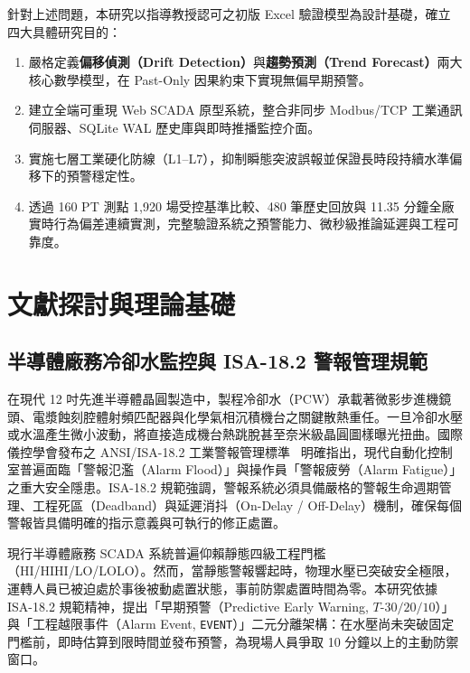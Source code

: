 \documentclass[fontset=none, a4paper, 12pt]{ctexart}
\begin{document}
\begin{doublespace}
針對上述問題，本研究以指導教授認可之初版 Excel 驗證模型為設計基礎，確立四大具體研究目的：
\begin{enumerate}
    \item 嚴格定義\textbf{偏移偵測（Drift Detection）}與\textbf{趨勢預測（Trend Forecast）}兩大核心數學模型，在 Past-Only 因果約束下實現無偏早期預警。
    \item 建立全端可重現 Web SCADA 原型系統，整合非同步 Modbus/TCP 工業通訊伺服器、SQLite WAL 歷史庫與即時推播監控介面。
    \item 實施七層工業硬化防線（L1–L7），抑制瞬態突波誤報並保證長時段持續水準偏移下的預警穩定性。
    \item 透過 160 PT 測點 1,920 場受控基準比較、480 筆歷史回放與 11.35 分鐘全廠實時行為偏差連續實測，完整驗證系統之預警能力、微秒級推論延遲與工程可靠度。
\end{enumerate}

\clearpage
\section{文獻探討與理論基礎}

\subsection{半導體廠務冷卻水監控與 ISA-18.2 警報管理規範}
在現代 12 吋先進半導體晶圓製造中，製程冷卻水（PCW）承載著微影步進機鏡頭、電漿蝕刻腔體射頻匹配器與化學氣相沉積機台之關鍵散熱重任。一旦冷卻水壓或水溫產生微小波動，將直接造成機台熱跳脫甚至奈米級晶圓圖樣曝光扭曲。國際儀控學會發布之 ANSI/ISA-18.2 工業警報管理標準~\cite{isa1822016} 明確指出，現代自動化控制室普遍面臨「警報氾濫（Alarm Flood）」與操作員「警報疲勞（Alarm Fatigue）」之重大安全隱患。ISA-18.2 規範強調，警報系統必須具備嚴格的警報生命週期管理、工程死區（Deadband）與延遲消抖（On-Delay / Off-Delay）機制，確保每個警報皆具備明確的指示意義與可執行的修正處置。

現行半導體廠務 SCADA 系統普遍仰賴靜態四級工程門檻（HI/HIHI/LO/LOLO）。然而，當靜態警報響起時，物理水壓已突破安全極限，運轉人員已被迫處於事後被動處置狀態，事前防禦處置時間為零。本研究依據 ISA-18.2 規範精神，提出「早期預警（Predictive Early Warning, $T\text{-}30/20/10$）」與「工程越限事件（Alarm Event, \texttt{EVENT}）」二元分離架構：在水壓尚未突破固定門檻前，即時估算到限時間並發布預警，為現場人員爭取 10 分鐘以上的主動防禦窗口。


\end{doublespace}
\end{document}
